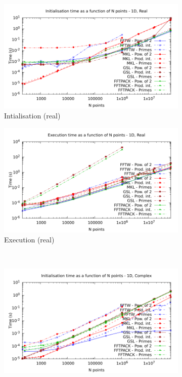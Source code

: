 \documentclass[12pt, a4paper]{article}
\begin{document}
\begin{figure}[H]
\captionsetup{width=0.8\linewidth}
\centering
\begin{subfigure}{.5\textwidth}
\centering
\includegraphics[width=.9\linewidth]{graphs/1d-init-r.pdf}
\caption{Intialisation (real)}
\label{1DRI}
\end{subfigure}%
\begin{subfigure}{.5\textwidth}
\centering
\includegraphics[width=.9\linewidth]{graphs/1d-exec-r.pdf}
\caption{Execution (real)}
\label{1DR}
\end{subfigure}\\
\begin{subfigure}{.5\textwidth}
\centering
\includegraphics[width=.9\linewidth]{graphs/1d-init-c.pdf}

\end{subfigure}
\end{figure}
\end{document}
